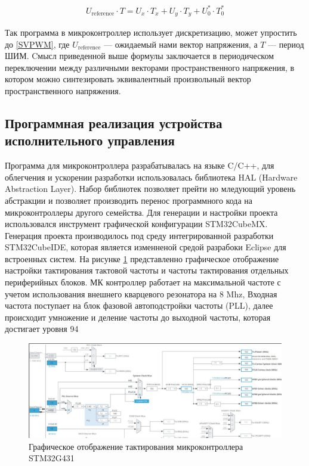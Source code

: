 \begin{ceqn}
	\begin{align} \label{SVPWM}
		U_{\text{reference}} \cdot T = U_x \cdot T_x + U_y \cdot T_y + U_0^* \cdot T_0^*
	\end{align}
\end{ceqn}

Так программа в микроконтроллер использует дискретизацию, может упростить до \ref{SVPWM}, где $U_{\text{reference}}$ — ожидаемый нами вектор напряжения, а $T$ — период ШИМ. Cмысл приведенной выше формулы заключается в периодическом переключении между различными векторами пространственного напряжения, в котором можно синтезировать эквивалентный произвольный вектор пространственного напряжения.



\subsection{Программная реализация устройства исполнительного управления}

Программа для микроконтроллера разрабатывалась на языке C/C++, для облегчения и ускорении разработки использовалась библиотека HAL (Hardware Abstraction Layer). Набор библиотек позволяет прейти но мледующий уровень абстракции и позволяет производить перенос программного кода на микроконтроллеры другого семейства. Для генерации и настройки проекта использовался инструмент графической конфигурации STM32CubeMX. Генерация проекта производилось под среду интегрированной разработки STM32CubeIDE, которая является изменненой средой разрабоки Eclipse для встроенных систем. На рисунке \ref{STM32G431MX} представленно графическое отображение настройки тактирования тактовой частоты и частоты тактирования отдельных периферийных блоков. МК контроллер работает на максимальной частоте с учетом использования внешнего кварцевого резонатора на 8 Mhz, Входная частота поступает на блок фазовой автоподстройки частоты (PLL), далее происходит умножение и деление частоты до выходной частоты, которая достигает уровня 94%


\begin{figure}[H]
	\centering
	\includegraphics[width=\textwidth]{Src/images/CubeMX.png}
	\caption{Графическое отображение тактирования микроконтроллера STM32G431}
	\label{STM32G431MX}
\end{figure}


